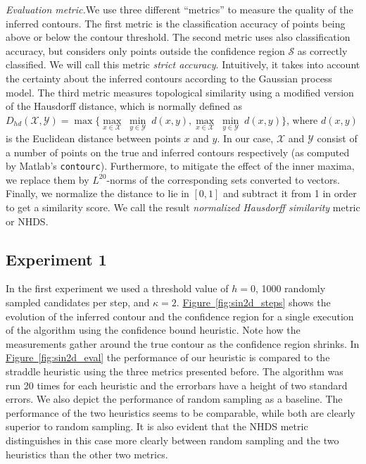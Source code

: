 \documentclass[11pt]{article} %
\newcommand{\figref}[1]{\hyperref[#1]{\mbox{Figure~\ref*{#1}}}}
\begin{document}
\noindent\emph{Evaluation metric.}\;We use three different ``metrics'' to
measure the quality of the inferred contours. The first metric is the
classification
accuracy of points being above or below the contour threshold. The second
metric uses also classification accuracy, but considers only points
outside the confidence region $\mathcal{S}$ as correctly classified.
We will call this metric \emph{strict accuracy}. Intuitively, it takes
into account
the certainty about the inferred contours according to the Gaussian process
model. The third metric measures topological similarity using a modified version
of the Hausdorff distance, which is normally defined as
$D_{hd}(\mathcal{X}, \mathcal{Y}) =
\max\{\underset{x\in\mathcal{X}}{\max}\;\underset{y\in\mathcal{Y}}{\min}\;d(x, y),
      \underset{x\in\mathcal{X}}{\max}\;\underset{y\in\mathcal{Y}}{\min}\;d(x, y)\}$,
where $d(x, y)$ is the Euclidean distance between points $x$ and $y$.
In our case, $\mathcal{X}$ and $\mathcal{Y}$ consist of a number of points on
the true and inferred contours respectively (as computed by Matlab's
\texttt{contourc}). Furthermore, to mitigate the effect of the inner maxima,
we replace them by $L^{20}$-norms of the corresponding sets converted to
vectors. Finally, we normalize the distance to lie in $[0, 1]$ and subtract it
from 1 in order to get a similarity score. We call the result
\emph{normalized Hausdorff similarity} metric or NHDS.

\subsection{Experiment 1}
In the first experiment we used a threshold value of $h = 0$, 1000 randomly
sampled candidates per step, and $\kappa = 2$.
\figref{fig:sin2d_steps} shows the evolution of the inferred contour and the
confidence region for a single execution of the algorithm using the confidence
bound heuristic. Note how the measurements gather around the true contour
as the confidence region shrinks. In \figref{fig:sin2d_eval} the performance
of our heuristic is compared to the straddle heuristic using the three metrics
presented before. The algorithm was run 20 times for each heuristic and the
errorbars have a height of two standard errors. We also depict the performance
of random sampling as a baseline. The performance of the two heuristics seems
to be comparable, while both are
clearly superior to random sampling. It is also evident that the NHDS metric
distinguishes in this case more clearly between
random sampling and the two heuristics than the other two metrics.
\end{document}
